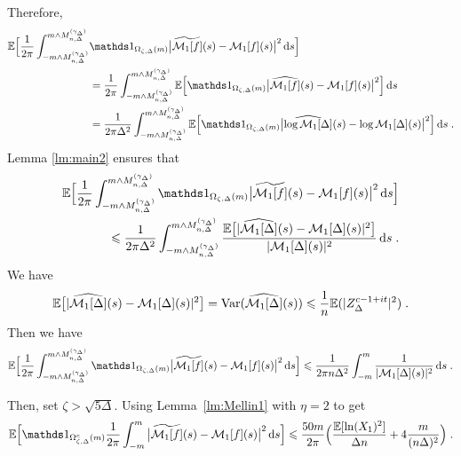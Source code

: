 Therefore,
\begin{align*}
    \EE \Big[\frac{1}{2\pi} \int_{-m \wedge M_{n, \Delta}^{(\gamma_\Delta)}}^{m \wedge M_{n, \Delta}^{(\gamma_\Delta)}} &\ind{\Omega_{\zeta, \Delta}(m)} \big|  \tilde{\Mcal_1[f]}(s) 
     -  \Mcal_1[f](s) \big|^2 \diff s \Big]   \\
    &
    = \frac{1}{2\pi} \int_{-m \wedge M_{n, \Delta}^{(\gamma_\Delta)}}^{m \wedge M_{n, \Delta}^{(\gamma_\Delta)}} \EE \Big[ \ind{\Omega_{\zeta, \Delta}(m)} \big|  \hat{\Mcal_1[f]}(s) -  \Mcal_1[f](s) \big|^2 \Big]\diff s \\
    &
    = \frac{1}{2\pi \Delta^2} \int_{-m \wedge M_{n, \Delta}^{(\gamma_\Delta)}}^{m \wedge M_{n, \Delta}^{(\gamma_\Delta)}} \EE \Big[ \ind{\Omega_{\zeta, \Delta}(m)} \big|  \hat{ \log \Mcal_1[\Delta]}(s) -  \log \Mcal_1[\Delta](s) \big|^2 \Big]\diff s 
    \eqfinp
\end{align*}
Lemma \ref{lm:main2} ensures that 
\begin{equation*}
    \begin{split}
       \EE \Big[\frac{1}{2\pi} \int_{-m \wedge M_{n, \Delta}^{(\gamma_\Delta)}}^{m \wedge M_{n, \Delta}^{(\gamma_\Delta)}}  \ind{\Omega_{\zeta, \Delta}(m)} \big|  \tilde{\Mcal_1[f]}(s) 
     -  \Mcal_1[f](s) \big|^2 \diff s \Big]  \\  
    \leq
    \frac{1}{2\pi \Delta^2} \int_{-m \wedge M_{n, \Delta}^{(\gamma_\Delta)}}^{m \wedge M_{n, \Delta}^{(\gamma_\Delta)}}\frac{  \EE \big[|\hat{\Mcal_1[\Delta]}(s) - \Mcal_1[\Delta](s)|^2 \big]}{|\Mcal_1[\Delta](s)|^2}\diff s
    \eqfinp
     \end{split}
\end{equation*}
We have
\begin{equation*}
     \mathbb{E} \big[|\widehat{\mathcal{M}_1[\Delta]}(s) - \mathcal{M}_1[\Delta](s)|^2 \big]
     = \operatorname{Var}(\widehat{\mathcal{M}_1[\Delta]}(s)) 
     \leqslant \frac{1}{n} \mathbb{E}(|Z_\Delta    ^{c-1 + it}|^2)
     \; .
\end{equation*}
Then we have
\begin{equation*}
    \EE \Big[\frac{1}{2\pi} \int_{-m \wedge M_{n, \Delta}^{(\gamma_\Delta)}}^{m \wedge M_{n, \Delta}^{(\gamma_\Delta)}} \ind{\Omega_{\zeta, \Delta}(m)} \big|  \tilde{\Mcal_1[f]}(s) 
    -  \Mcal_1[f](s) \big|^2 \diff s \Big]    
    \leq 
    \frac{1}{2\pi n \Delta^2} \int_{-m}^{m}\frac{1}{|\Mcal_1[\Delta](s)|^2}\diff s 
    \eqfinp
\end{equation*}

Then, set $\zeta > \sqrt{5 \Delta}$. Using Lemma~\ref{lm:Mellin1} with $\eta = 2$ to get
\begin{equation*}
    \EE \Big[\ind{\Omega_{\zeta, \Delta}^c(m)} \frac{1}{2\pi} \int_{-m}^m \big|  \tilde{\Mcal_1[f]}(s) -  \Mcal_1[f](s) \big|^2 \diff s \Big]
    \leq \frac{50 m}{2\pi} \Big(\frac{\EE[\ln(X_1)^2]}{\Delta n} + 4 \frac{m}{(n \Delta)^{2}} \Big)
    \eqfinp
\end{equation*}

